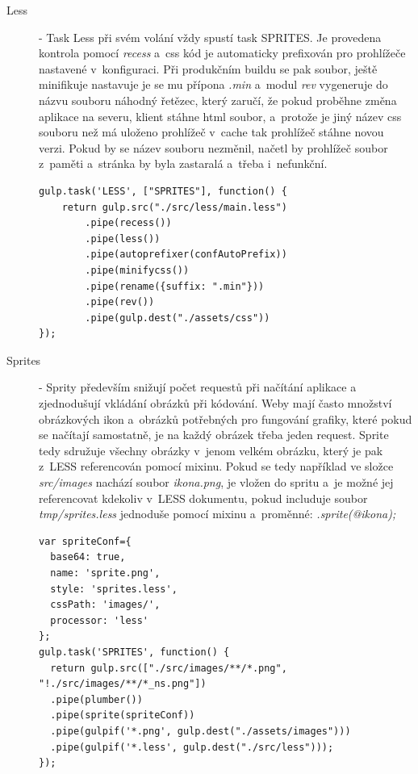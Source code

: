 \documentclass[a4paper,12pt,twoside,BCOR=10mm]{article}
\renewcommand{\it}[1]{\textit{#1}}    %
\newenvironment{codeframe}{%
  \begin{Sbox} 
    \begin{minipage} 
      {\columnwidth-\leftmargin-\rightmargin-2\fboxsep-2\fboxrule-4pt} 
}{%

  \end{minipage} 
  \end{Sbox} 
  \begin{center} 
    \fcolorbox{black}{codeback}{\TheSbox} 
  \end{center} 
}
\begin{document}
\begin{description}
\item[Less] - Task Less při svém volání vždy spustí task SPRITES. Je provedena kontrola pomocí \it{recess} a~css kód je automaticky prefixován pro prohlížeče nastavené v~konfiguraci. Při produkčním buildu se pak soubor, ještě minifikuje nastavuje je se mu přípona \it{.min} a~modul \it{rev} vygeneruje do názvu souboru náhodný řetězec, který zaručí, že pokud proběhne změna aplikace na severu, klient stáhne html soubor, a~protože je jiný název css souboru než má uloženo prohlížeč v~cache tak prohlížeč stáhne novou verzi. Pokud by se název souboru nezměnil, načetl by prohlížeč soubor z~paměti a~stránka by byla zastaralá a~třeba i~nefunkční.
\begin{codeframe}
  \begin{verbatim}
gulp.task('LESS', ["SPRITES"], function() {
    return gulp.src("./src/less/main.less")
        .pipe(recess())
        .pipe(less())
        .pipe(autoprefixer(confAutoPrefix))
        .pipe(minifycss())
        .pipe(rename({suffix: ".min"}))
        .pipe(rev())
        .pipe(gulp.dest("./assets/css"))
});
  \end{verbatim}
\end{codeframe}

\item[Sprites] - Sprity především snižují počet requestů při načítání aplikace a zjednodušují vkládání obrázků při kódování. Weby mají často množství obrázkových ikon a~obrázků potřebných pro fungování grafiky, které pokud se načítají samostatně, je na každý obrázek třeba jeden request. Sprite tedy sdružuje všechny obrázky v~jenom velkém obrázku, který je pak z~LESS referencován pomocí mixinu. Pokud se tedy například ve složce \it{src/images} nachází soubor \it{ikona.png}, je vložen do spritu a~je možné jej referencovat kdekoliv v~LESS dokumentu, pokud includuje soubor \it{tmp/sprites.less} jednoduše pomocí mixinu a~proměnné: \it{.sprite(@ikona);}
\begin{codeframe}
  \begin{verbatim}
var spriteConf={
  base64: true,
  name: 'sprite.png',
  style: 'sprites.less',
  cssPath: 'images/',
  processor: 'less'
};
gulp.task('SPRITES', function() {
  return gulp.src(["./src/images/**/*.png", "!./src/images/**/*_ns.png"])
  .pipe(plumber())
  .pipe(sprite(spriteConf))
  .pipe(gulpif('*.png', gulp.dest("./assets/images")))
  .pipe(gulpif('*.less', gulp.dest("./src/less")));
});
  \end{verbatim}
\end{codeframe}


\end{description}
\end{document}
